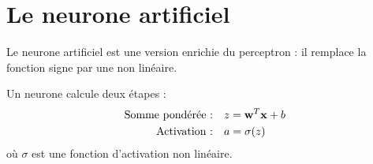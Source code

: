 %






\setlength{\parskip}{2pt}
\setlength{\abovedisplayskip}{5pt}
\setlength{\belowdisplayskip}{5pt}

\section{Le neurone artificiel}

Le neurone artificiel est une version enrichie du perceptron :
il remplace la fonction signe par une  non lin\'{e}aire.

\begin{definitionbox}
    Un neurone calcule deux \'{e}tapes :
    \begin{align}
        \text{Somme pond\'{e}r\'{e}e :}\quad & z = \mathbf{w}^T \mathbf{x} + b
        \label{eq:somme} \\
        \text{Activation :}\quad & a = \sigma(z)
        \label{eq:activation}
    \end{align}
    o\`{u} $\sigma$ est une fonction d'activation non lin\'{e}aire.
\end{definitionbox}

